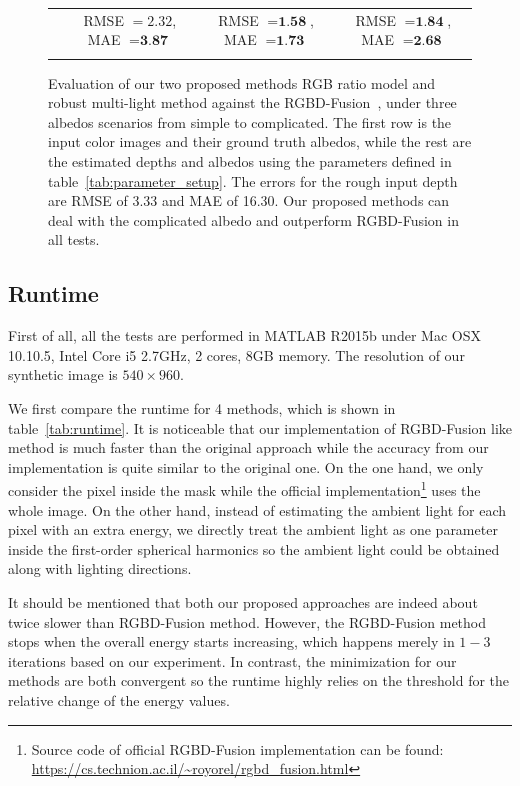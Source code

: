\begin{figure}[H]
{\begin{tabular}{cccc}
& {\small RMSE $= 2.32$, MAE $=\textbf{3.87}$} & {\small RMSE $= \textbf{1.58}$, MAE $=\textbf{1.73}$} & {\small RMSE $= \textbf{1.84}$, MAE $=\textbf{2.68}$} \\
 \\
  \end{tabular}
  }
  \caption{Evaluation of our two proposed methods RGB ratio model and robust multi-light method against the RGBD-Fusion~\cite{or2015rgbd}, under three albedos scenarios from simple to complicated. The first row is the input color images and their ground truth albedos, while the rest are the estimated depths and albedos using the parameters defined in table~\ref{tab:parameter_setup}. The errors for the rough input depth are RMSE of 3.33 and MAE of 16.30. Our proposed methods can deal with the complicated albedo and outperform RGBD-Fusion in all tests.}
  \label{fig:result_syn_comp}
\end{figure}


\subsection{Runtime}
First of all, all the tests are performed in MATLAB R2015b under Mac OSX 10.10.5, Intel Core i5 2.7GHz, 2 cores, 8GB memory. 
The resolution of our synthetic image is $540\times 960$.

We first compare the runtime for 4 methods, which is shown in table~\ref{tab:runtime}.
It is noticeable that our implementation of RGBD-Fusion like method is much faster than the original approach while the accuracy from our implementation is quite similar to the original one.
On the one hand, we only consider the pixel inside the mask while the official implementation\footnote{Source code of official RGBD-Fusion implementation can be found: \url{https://cs.technion.ac.il/~royorel/rgbd_fusion.html}} uses the whole image.
On the other hand, instead of estimating the ambient light for each pixel with an extra energy, we directly treat the ambient light as one parameter inside the first-order spherical harmonics so the ambient light could be obtained along with lighting directions.

It should be mentioned that both our proposed approaches are indeed about twice slower than RGBD-Fusion method. 
However, the RGBD-Fusion method stops when the overall energy starts increasing, which happens merely in $1-3$ iterations based on our experiment.  
In contrast, the minimization for our methods are both convergent so the runtime highly relies on the threshold for the relative change of the energy values.


